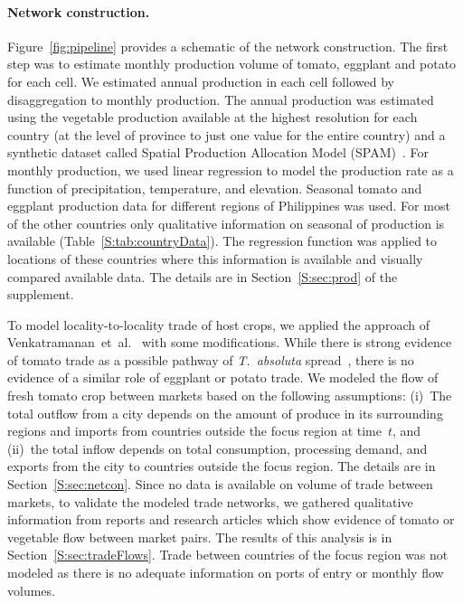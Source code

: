 \documentclass[11pt]{article}
\newcommand{\tuta}{\emph{T.~absoluta}}
\theoremstyle{definition}
\begin{document}
\paragraph{Network construction.} 
Figure~\ref{fig:pipeline} provides a schematic of the network construction.
The first step was to estimate monthly production volume of tomato,
eggplant and potato for each cell. We estimated annual production in each
cell followed by disaggregation to monthly production. The annual
production was estimated using the vegetable production available at the
highest resolution for each country (at the level of province to just one
value for the entire country) and a synthetic dataset called Spatial
Production Allocation Model (SPAM)~\cite{spam}. For monthly production, we
used linear regression to model the production rate as a function of
precipitation, temperature, and elevation. Seasonal tomato and eggplant
production data for different regions of Philippines was used. For most of
the other countries only qualitative information on seasonal of production
is available (Table~\ref{S:tab:countryData}). The regression function was
applied to locations of these countries where this information is
available and visually compared available data. The details are in
Section~\ref{S:sec:prod} of the supplement.

To model locality-to-locality trade of host crops, we applied the approach
of
Venkatramanan~et~al.~\cite{venkatramanan2017towards,venkatramanan2019modeling}
with some modifications. While there is strong evidence of tomato trade as
a possible pathway of \tuta{} spread~\cite{biondi2017}, there is no
evidence of a similar role of eggplant or potato trade.  We modeled the
flow of fresh tomato crop between markets based on the following
assumptions: (i)~The total outflow from a city depends on the amount of
produce in its surrounding regions and imports from countries outside the
focus region at time~$t$, and (ii)~the total inflow depends on total
consumption, processing demand, and exports from the city to countries
outside the focus region. The details are in Section~\ref{S:sec:netcon}.
Since no data is available on volume of trade between markets, to validate
the modeled trade networks, we gathered qualitative information from
reports and research articles which show evidence of tomato or vegetable
flow between market pairs. The results of this analysis is in
Section~\ref{S:sec:tradeFlows}.  Trade between countries of the focus
region was not modeled as there is no adequate information on ports of
entry or monthly flow volumes.
\end{document}
